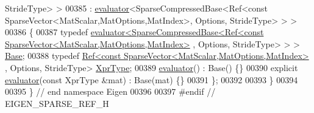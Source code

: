 \begin{DoxyCode}
      StrideType> >
00385   : \hyperlink{struct_eigen_1_1internal_1_1evaluator}{evaluator}<SparseCompressedBase<Ref<const SparseVector<MatScalar,MatOptions,MatIndex>, Options,
       StrideType> > >
00386 \{
00387   \textcolor{keyword}{typedef} 
      \hyperlink{struct_eigen_1_1internal_1_1evaluator}{evaluator<SparseCompressedBase<Ref<const SparseVector<MatScalar,MatOptions,MatIndex>}
      , Options, StrideType> > > \hyperlink{struct_eigen_1_1internal_1_1evaluator}{Base};
00388   \textcolor{keyword}{typedef} \hyperlink{group___core___module_class_eigen_1_1_ref}{Ref<const SparseVector<MatScalar,MatOptions,MatIndex>}
      , Options, StrideType> \hyperlink{class_eigen_1_1_ref_3_01const_01_sparse_vector_3_01_mat_scalar_00_01_mat_options_00_01_mat_index673660e6a13ed7a7b712b0f75a25d720}{XprType};
00389   \hyperlink{struct_eigen_1_1internal_1_1evaluator}{evaluator}() : Base() \{\}
00390   \textcolor{keyword}{explicit} \hyperlink{struct_eigen_1_1internal_1_1evaluator}{evaluator}(\textcolor{keyword}{const} XprType &mat) : Base(mat) \{\}
00391 \};
00392 
00393 \}
00394 
00395 \} \textcolor{comment}{// end namespace Eigen}
00396 
00397 \textcolor{preprocessor}{#endif // EIGEN\_SPARSE\_REF\_H}
\end{DoxyCode}
